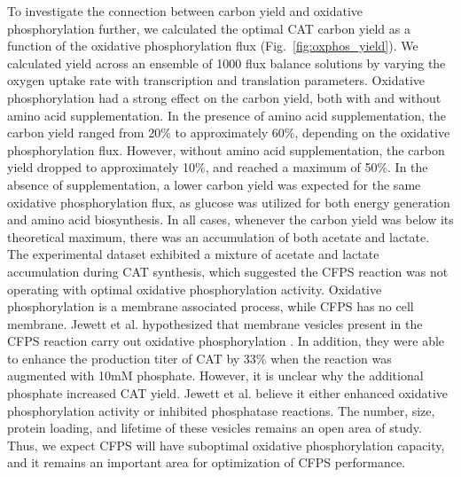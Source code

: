 \documentclass[journal=asbcd6,manuscript=article]{achemso}
\begin{document}

To investigate the connection between carbon yield and oxidative phosphorylation further, we calculated the optimal CAT carbon yield as a function of the oxidative phosphorylation flux (Fig.~\ref{fig:oxphos_yield}).
We calculated yield across an ensemble of 1000 flux balance solutions by varying the oxygen uptake rate with transcription and translation parameters.
Oxidative phosphorylation had a strong effect on the carbon yield, both with and without amino acid supplementation.
In the presence of amino acid supplementation, the carbon yield ranged from 20\% to approximately 60\%, depending on the oxidative phosphorylation flux.
However, without amino acid supplementation, the carbon yield dropped to approximately 10\%, and reached a maximum of 50\%.
In the absence of supplementation, a lower carbon yield was expected for the same oxidative phosphorylation flux, as glucose was utilized for both energy generation and amino acid biosynthesis.
In all cases, whenever the carbon yield was below its theoretical maximum, there was an accumulation of both acetate and lactate.
The experimental dataset exhibited a mixture of acetate and lactate accumulation during CAT synthesis, which suggested the CFPS reaction was not operating with optimal oxidative phosphorylation activity.
Oxidative phosphorylation is a membrane associated process, while CFPS has no cell membrane.
Jewett et al. hypothesized that membrane vesicles present in the CFPS reaction carry out oxidative phosphorylation \cite{Jewett:2008aa}.
In addition, they were able to enhance the production titer of CAT by 33\% when the reaction was augmented with 10mM phosphate.
However, it is unclear why the additional phosphate increased CAT yield.
Jewett et al. believe it either enhanced oxidative phosphorylation activity or inhibited phosphatase reactions.
The number, size, protein loading, and lifetime of these vesicles remains an open area of study.
Thus, we expect CFPS will have suboptimal oxidative phosphorylation capacity, and it remains an important area for optimization of CFPS performance.
\end{document}
